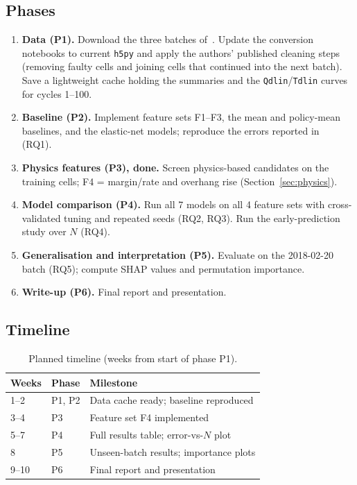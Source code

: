 \subsection{Phases}
\begin{enumerate}
  \item \textbf{Data (P1).} Download the three batches of~\cite{matr_data}.
  Update the conversion notebooks to current \texttt{h5py} and apply the
  authors' published cleaning steps (removing faulty cells and joining
  cells that continued into the next batch). Save a lightweight cache
  holding the summaries and the \texttt{Qdlin}/\texttt{Tdlin} curves for
  cycles 1--100.
  \item \textbf{Baseline (P2).} Implement feature sets F1--F3, the
  mean and policy-mean baselines, and the elastic-net models; reproduce the
  errors reported in~\cite{severson2019} (RQ1).
  \item \textbf{Physics features (P3), done.} Screen physics-based
  candidates on the training cells; F4 = margin/rate and overhang
  rise (Section~\ref{sec:physics}).
  \item \textbf{Model comparison (P4).} Run all 7 models on all 4 feature
  sets with cross-validated tuning and repeated seeds (RQ2, RQ3). Run the
  early-prediction study over $N$ (RQ4).
  \item \textbf{Generalisation and interpretation (P5).} Evaluate on the
  2018-02-20 batch (RQ5); compute SHAP values and permutation importance.
  \item \textbf{Write-up (P6).} Final report and presentation.
\end{enumerate}

\subsection{Timeline}
\begin{table}[h]
\centering
\caption{Planned timeline (weeks from start of phase P1).}
\label{tab:timeline}
\begin{tabular}{@{}lll@{}}
\toprule
Weeks & Phase & Milestone \\
\midrule
1--2  & P1, P2 & Data cache ready; baseline reproduced \\
3--4  & P3     & Feature set F4 implemented \\
5--7  & P4     & Full results table; error-vs-$N$ plot \\
8     & P5     & Unseen-batch results; importance plots \\
9--10 & P6     & Final report and presentation \\
\bottomrule
\end{tabular}
\end{table}

